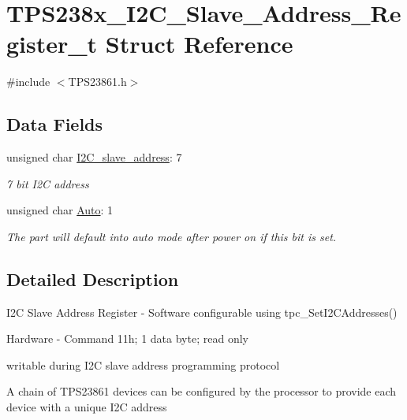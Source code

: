 \hypertarget{struct_t_p_s238x___i2_c___slave___address___register__t}{\section{T\-P\-S238x\-\_\-\-I2\-C\-\_\-\-Slave\-\_\-\-Address\-\_\-\-Register\-\_\-t Struct Reference}
\label{struct_t_p_s238x___i2_c___slave___address___register__t}
}


{\ttfamily \#include $<$T\-P\-S23861.\-h$>$}

\subsection*{Data Fields}
\begin{DoxyCompactItemize}
\item 
unsigned char \hyperlink{struct_t_p_s238x___i2_c___slave___address___register__t_a94600a1a08c1e36d8843eecfb7e61280}{I2\-C\-\_\-slave\-\_\-address}\-: 7
\begin{DoxyCompactList}\small\item\em 7 bit I2\-C address \end{DoxyCompactList}\item 
unsigned char \hyperlink{struct_t_p_s238x___i2_c___slave___address___register__t_a565486a94b18eda9249c26e391a27816}{Auto}\-: 1
\begin{DoxyCompactList}\small\item\em The part will default into auto mode after power on if this bit is set. \end{DoxyCompactList}\end{DoxyCompactItemize}


\subsection{Detailed Description}
I2\-C Slave Address Register -\/ Software configurable using tpc\-\_\-\-Set\-I2\-C\-Addresses() \par
 Hardware -\/ Command 11h; 1 data byte; read only \par

\begin{DoxyItemize}
\item writable during I2\-C slave address programming protocol \par
\par
 A chain of T\-P\-S23861 devices can be configured by the processor to provide each device with a unique I2\-C address 
\end{DoxyItemize}

